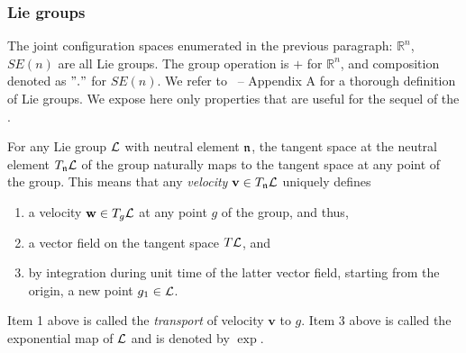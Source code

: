 \subsubsection{Lie groups}

The joint configuration spaces enumerated in the previous paragraph: $\mathbb{R}^n$, $SE(n)$ are all Lie groups. The group operation is $+$ for $\mathbb{R}^n$, and composition denoted as $"."$ for $SE(n)$. We refer to~\cite{LMS94} -- Appendix A for a thorough definition of Lie groups. We expose here only properties that are useful for the sequel of the \paper.

For any Lie group $\mathcal{L}$ with neutral element $\mathfrak{n}$, the tangent space at the neutral element $T_{\mathfrak{n}}\mathcal{L}$ of the group naturally maps to the tangent space at any point of the group. This means that any \textit{velocity} $\mathbf{v}\in T_{\mathfrak{n}}\mathcal{L}$ uniquely defines
\begin{enumerate}
\item a velocity $\mathbf{w}\in T_{g}\mathcal{L}$ at any point $g$ of the group, and thus,
\item a vector field on the tangent space $T\mathcal{L}$, and
\item by integration during unit time of the latter vector field, starting from the origin, a new point $g_{1}\in\mathcal{L}$.
\end{enumerate}
Item 1 above is called the \textit{transport} of velocity $\mathbf{v}$ to $g$.
Item 3 above is called the exponential map of $\mathcal{L}$ and is denoted by $\exp$.

